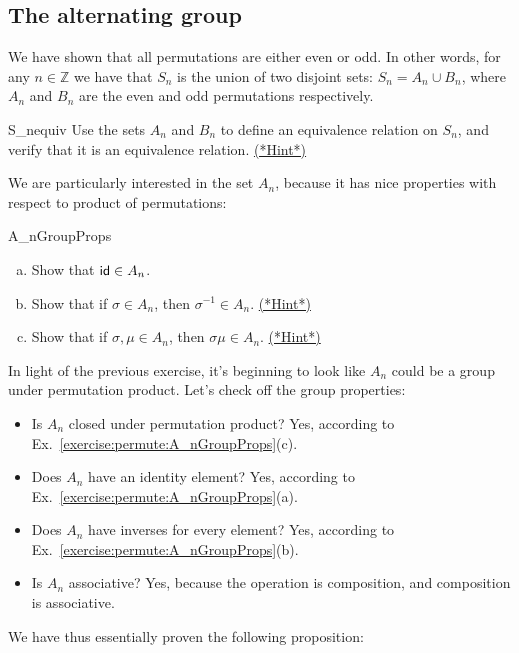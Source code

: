 \subsection{The alternating group}\label{sec:AlternatingGroup}

We have shown that all permutations are either even or odd. In other words, for any $n \in \mathbb{Z}$ we have that $S_n$ is the union of two disjoint sets: $S_n = A_n \cup B_n$, where $A_n$ and $B_n$ are the even and odd permutations respectively.

\begin{exercise}{S_nequiv}
Use the sets $A_n$ and $B_n$ to define an equivalence relation on $S_n$, and verify that it is an equivalence relation.
\hyperref[sec:permute:hints]{(*Hint*)}
\end{exercise}

We are particularly interested in the set $A_n$, because it has nice properties with respect to product of permutations:

\begin{exercise}{A_nGroupProps}
\begin{enumerate}[(a)]
\item
Show that ${\sf{i}d}  \in A_n$.
\item
Show that if $\sigma \in A_n$, then $\sigma^{-1} \in A_n$.
\hyperref[sec:permute:hints]{(*Hint*)}
\item
Show that if $\sigma, \mu \in A_n$, then $\sigma \mu \in A_n$. 
\hyperref[sec:permute:hints]{(*Hint*)}
\end{enumerate}
\end{exercise}

In light of the previous exercise, it's beginning to look like $A_n$ could be a group under permutation product. Let's check off the group properties:
\begin{itemize}
\item Is $A_n$ closed under permutation product? Yes, according to Ex.~\ref{exercise:permute:A_nGroupProps}(c).
\item Does $A_n$ have an identity element? Yes, according to Ex.~\ref{exercise:permute:A_nGroupProps}(a).
\item Does $A_n$ have inverses for every element? Yes, according to Ex.~\ref{exercise:permute:A_nGroupProps}(b).
\item Is $A_n$ associative? Yes, because the operation is composition, and composition is associative.
\end{itemize}

\noindent
We have thus essentially proven the following proposition:

